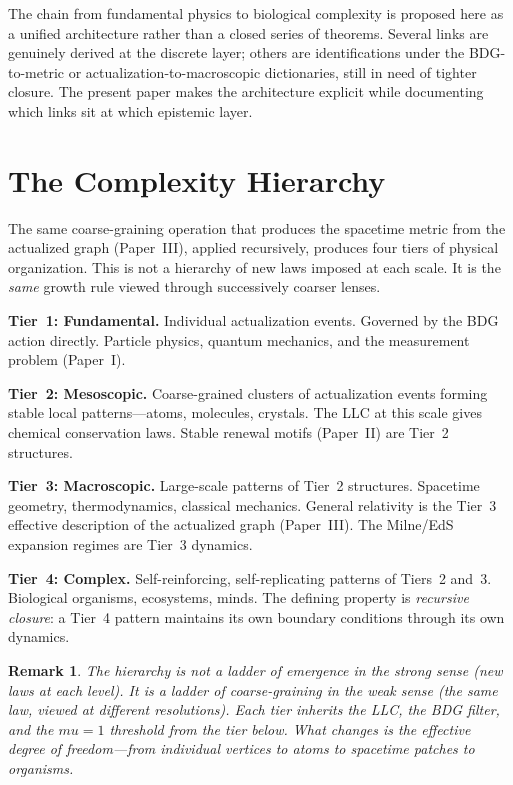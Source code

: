 \documentclass[11pt]{article}
\def\mu{mu}%
\newtheorem{remark}{Remark}
\begin{document}
The chain from fundamental physics to biological complexity is proposed here as a unified architecture rather than a closed series of theorems. Several links are genuinely derived at the discrete layer; others are identifications under the BDG-to-metric or actualization-to-macroscopic dictionaries, still in need of tighter closure. The present paper makes the architecture explicit while documenting which links sit at which epistemic layer.

\section{The Complexity Hierarchy}
\label{sec:hierarchy}

The same coarse-graining operation that produces the spacetime metric from the actualized graph (Paper~III), applied recursively, produces four tiers of physical organization. This is not a hierarchy of new laws imposed at each scale. It is the \emph{same} growth rule viewed through successively coarser lenses.

\textbf{Tier~1: Fundamental.} Individual actualization events. Governed by the BDG action directly. Particle physics, quantum mechanics, and the measurement problem (Paper~I).

\textbf{Tier~2: Mesoscopic.} Coarse-grained clusters of actualization events forming stable local patterns---atoms, molecules, crystals. The LLC at this scale gives chemical conservation laws. Stable renewal motifs (Paper~II) are Tier~2 structures.

\textbf{Tier~3: Macroscopic.} Large-scale patterns of Tier~2 structures. Spacetime geometry, thermodynamics, classical mechanics. General relativity is the Tier~3 effective description of the actualized graph (Paper~III). The Milne/EdS expansion regimes are Tier~3 dynamics.

\textbf{Tier~4: Complex.} Self-reinforcing, self-replicating patterns of Tiers~2 and~3. Biological organisms, ecosystems, minds. The defining property is \emph{recursive closure}: a Tier~4 pattern maintains its own boundary conditions through its own dynamics.

\begin{remark}
The hierarchy is not a ladder of emergence in the strong sense (new laws at each level). It is a ladder of coarse-graining in the weak sense (the same law, viewed at different resolutions). Each tier inherits the LLC, the BDG filter, and the $\mu=1$ threshold from the tier below. What changes is the effective degree of freedom---from individual vertices to atoms to spacetime patches to organisms.
\end{remark}
\end{document}
